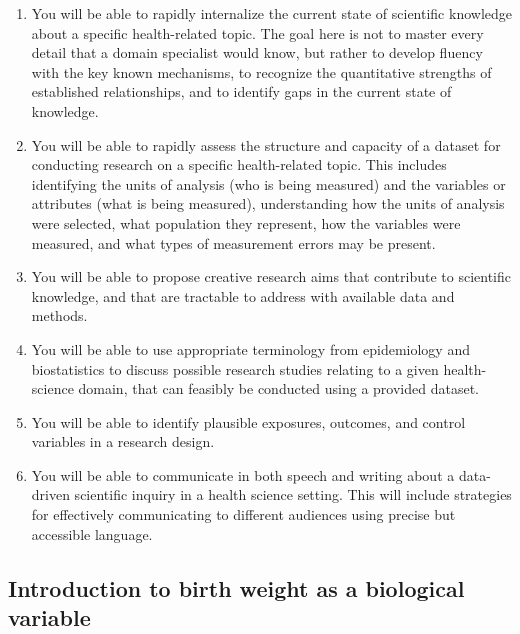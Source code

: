 \begin{enumerate}

\item You will be able to rapidly internalize the current state of scientific knowledge about a specific health-related topic. The goal here is not to master every detail that a domain specialist would know, but rather to develop fluency with the key known mechanisms, to recognize the quantitative strengths of established relationships, and to identify gaps in the current state of knowledge.

\item You will be able to rapidly assess the structure and capacity of a dataset for conducting research on a specific health-related topic. This includes identifying the units of analysis (who is being measured) and the variables or attributes (what is being measured), understanding how the units of analysis were selected, what population they represent, how the variables were measured, and what types of measurement errors may be present.

\item You will be able to propose creative research aims that contribute to scientific knowledge, and that are tractable to address with available data and methods.

\item You will be able to use appropriate terminology from epidemiology and biostatistics to discuss possible research studies relating to a given health-science domain, that can feasibly be conducted using a provided dataset.

\item You will be able to identify plausible exposures, outcomes, and control variables in a research design.

\item You will be able to communicate in both speech and writing about a data-driven scientific inquiry in a health science setting. This will include strategies for effectively communicating to different audiences using precise but accessible language.

\end{enumerate}

\subsection{Introduction to birth weight as a biological variable}

